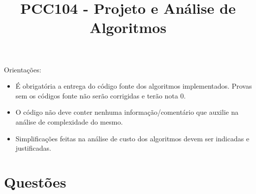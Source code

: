 \documentclass{article}
\title{\vspace{-2 cm} PCC104 - Projeto e Análise de Algoritmos}
\begin{document}
\maketitle

Orientações:
\begin{itemize}
    \item É obrigatória a entrega do código fonte dos algoritmos implementados. Provas sem os códigos fonte não serão corrigidas e terão nota 0.
    \item O código não deve conter nenhuma informação/comentário que auxilie na análise de complexidade do mesmo.  
    \item Simplificações feitas na análise de custo dos algoritmos devem ser indicadas e justificadas.
\end{itemize}

\section*{Questões}
\end{document}
